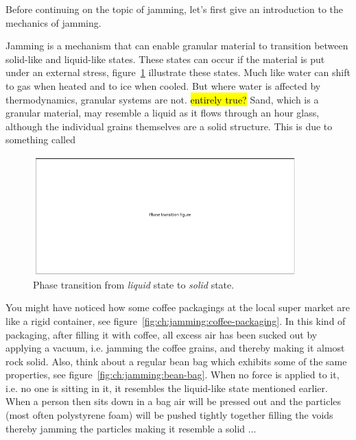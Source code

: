 Before continuing on the topic of jamming, let's first give an introduction to the mechanics of jamming.

Jamming is a mechanism that can enable granular material to transition between solid-like and liquid-like states. These states can occur if the material is put under an external stress, figure~\ref{fig:ch:jamming:phase-transition} illustrate these states.
Much like water can shift to gas when heated and to ice when cooled. But where water is affected by thermodynamics, granular systems are not. \hl{entirely true?}
Sand, which is a granular material, may resemble a liquid as it flows through an hour glass, although the individual grains themselves are a solid structure. This is due to something called 

\begin{figure}[hb]
	\centering
  		\includegraphics[width=4in]{figures/jamming/phase_transition}
	\caption[Phase transition from \textit{liquid} state to \textit{solid} state.]
   {Phase transition from \textit{liquid} state to \textit{solid} state.}
   \label{fig:ch:jamming:phase-transition}
\end{figure}

You might have noticed how some coffee packagings at the local super market are like a rigid container, see figure~\ref{fig:ch:jamming:coffee-packaging}. 
In this kind of packaging, after filling it with coffee, all excess air has been sucked out by applying a vacuum, i.e. jamming the coffee grains, and thereby making it almost rock solid. 
Also, think about a regular bean bag which exhibits some of the same properties, see figure~\ref{fig:ch:jamming:bean-bag}. 
When no force is applied to it, i.e. no one is sitting in it, it resembles the liquid-like state mentioned earlier. 
When a person then sits down in a bag air will be pressed out and the particles (most often polystyrene foam) will be pushed tightly together filling the voids   thereby jamming the particles making it resemble a solid ...

